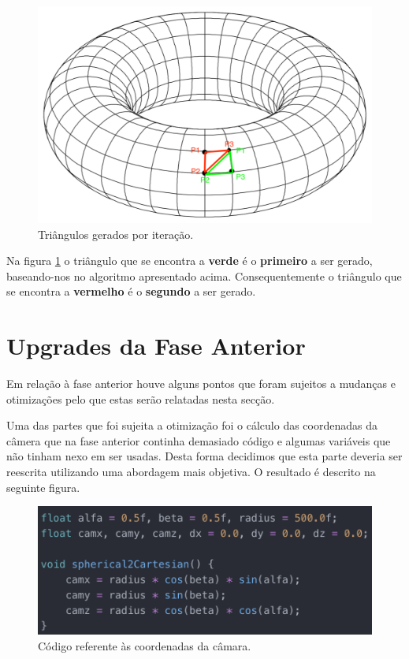 \documentclass[a4paper]{article}
\begin{document}
\begin{figure}[H]
\centering
\includegraphics[scale=0.3]{torus_triangulos.png}
\caption{Triângulos gerados por iteração.}
\label{img:torus_triangulos}
\end{figure}

Na figura \ref{img:torus_triangulos} o triângulo que se encontra a \textbf{verde} é o \textbf{primeiro} a ser gerado, baseando-nos no algoritmo apresentado acima. Consequentemente o triângulo que se encontra a \textbf{vermelho} é o \textbf{segundo} a ser gerado.



\newpage

\section{Upgrades da Fase Anterior}

Em relação à fase anterior houve alguns pontos que foram sujeitos a mudanças e otimizações pelo que estas serão relatadas nesta secção.

Uma das partes que foi sujeita a otimização foi o cálculo das coordenadas da câmera que na fase anterior continha demasiado código e algumas variáveis que não tinham nexo em ser usadas.
Desta forma decidimos que esta parte deveria ser reescrita utilizando uma abordagem mais objetiva. O resultado é descrito na seguinte figura.

\begin{figure}[H]
\centering
\includegraphics[scale=0.9]{camara.png}
\caption{Código referente às coordenadas da câmara.}
\label{img:camara}
\end{figure}
\end{document}
